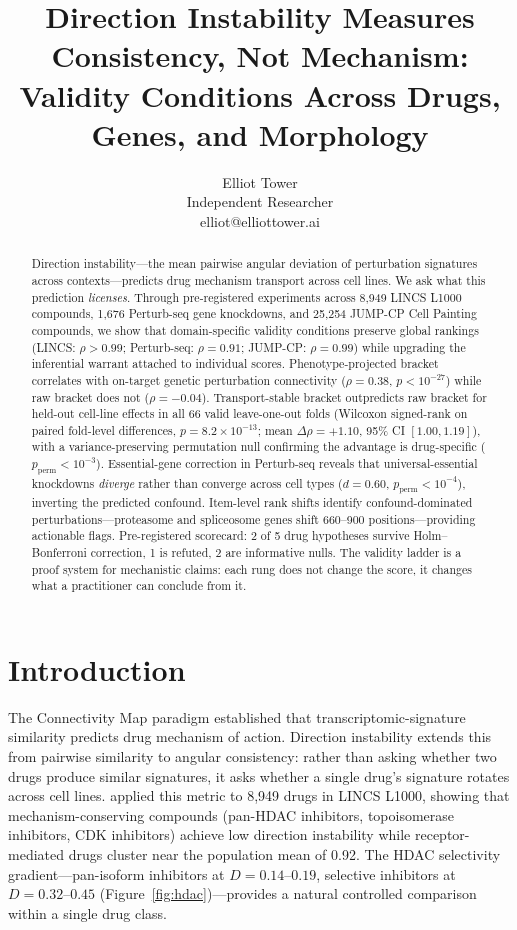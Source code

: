 \documentclass{article}
\title{Direction Instability Measures Consistency, Not Mechanism:\\ Validity Conditions Across Drugs, Genes, and Morphology}
\author{\name Elliot Tower \\
      \addr Independent Researcher \\
      \email elliot@elliottower.ai}
\begin{document}
\maketitle

\begin{abstract}
Direction instability---the mean pairwise angular deviation of perturbation
signatures across contexts---predicts drug mechanism transport across cell
lines. We ask what this prediction \emph{licenses}. Through pre-registered
experiments across 8{,}949 LINCS L1000 compounds, 1{,}676 Perturb-seq gene
knockdowns, and 25{,}254 JUMP-CP Cell Painting compounds, we show that
domain-specific validity conditions preserve global rankings (LINCS:
$\rho > 0.99$; Perturb-seq: $\rho = 0.91$; JUMP-CP: $\rho = 0.99$)
while upgrading the inferential warrant attached to individual scores.
Phenotype-projected bracket correlates with on-target genetic perturbation
connectivity ($\rho = 0.38$, $p < 10^{-27}$) while raw bracket does not
($\rho = -0.04$). Transport-stable bracket outpredicts raw bracket for
held-out cell-line effects in all 66 valid leave-one-out folds
(Wilcoxon signed-rank on paired fold-level differences,
$p = 8.2 \times 10^{-13}$; mean
$\Delta\rho = +1.10$, 95\% CI $[1.00, 1.19]$), with a
variance-preserving permutation null confirming the advantage is
drug-specific ($p_{\text{perm}} < 10^{-3}$). Essential-gene correction
in Perturb-seq reveals that universal-essential knockdowns \emph{diverge}
rather than converge across cell types ($d = 0.60$,
$p_{\text{perm}} < 10^{-4}$), inverting the predicted confound. Item-level
rank shifts identify confound-dominated perturbations---proteasome and
spliceosome genes shift 660--900 positions---providing actionable flags.
Pre-registered scorecard: 2 of 5 drug hypotheses survive
Holm--Bonferroni correction, 1 is refuted, 2 are informative nulls.
The validity ladder is a proof system for mechanistic
claims: each rung does not change the score, it changes what a
practitioner can conclude from it.
\end{abstract}

\section{Introduction}

The Connectivity Map paradigm \citep{lamb2006connectivity,subramanian2017next}
established that transcriptomic-signature similarity predicts drug mechanism
of action. Direction instability extends this from pairwise similarity to
angular consistency: rather than asking whether two drugs produce similar
signatures, it asks whether a single drug's signature rotates across cell
lines. \citet{tower2026bracket} applied this metric to 8{,}949 drugs in
LINCS L1000, showing that mechanism-conserving compounds (pan-HDAC
inhibitors, topoisomerase inhibitors, CDK inhibitors) achieve low direction
instability while receptor-mediated drugs cluster near the population mean
of 0.92. The HDAC selectivity gradient---pan-isoform
inhibitors at $D = 0.14$--$0.19$, selective inhibitors at
$D = 0.32$--$0.45$ (Figure~\ref{fig:hdac})---provides a natural controlled
comparison within a single drug class.
\end{document}
